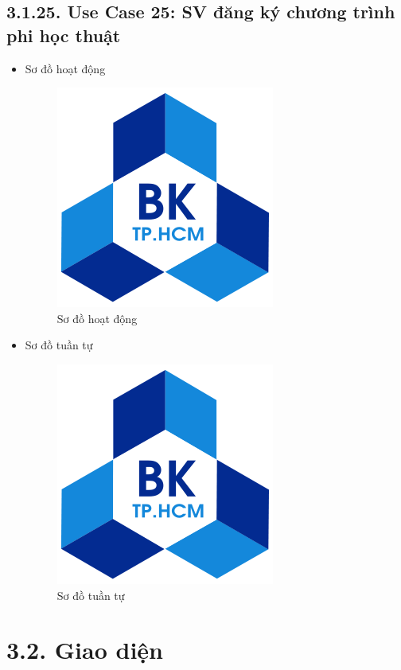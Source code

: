 \subsection*{3.1.25. Use Case 25: SV đăng ký chương trình phi học thuật}
\begin{itemize}
    \item Sơ đồ hoạt động
    \begin{figure}[H]
    \centering
    \includegraphics[scale=0.5 ]{Picture/hcmut.png}
    \caption{Sơ đồ hoạt động }
    \end{figure}
    \item Sơ đồ tuần tự
    \begin{figure}[H]
    \centering
    \includegraphics[scale=0.5 ]{Picture/hcmut.png}
    \caption{Sơ đồ tuần tự }
    \end{figure}
\end{itemize}

\section*{3.2. Giao diện}
